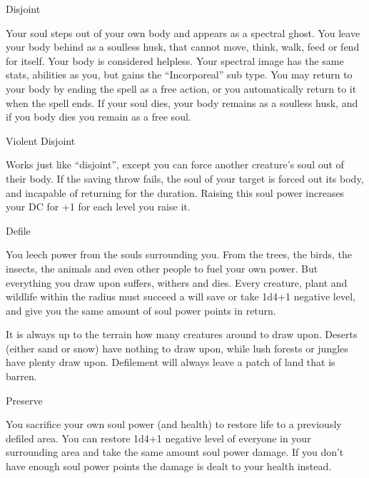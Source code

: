 \begin{soulpower}{Disjoint}
  \components{-}
  \rangepersonal

  Your soul steps out of your own body and appears as a spectral ghost. You
  leave your body behind as a soulless husk, that cannot move, think, walk,
  feed or fend for itself. Your body is considered helpless.
  Your spectral image has the same stats, abilities as you, but gains the
  ``Incorporeal'' sub type. You may return to your body by ending the spell
  as a free action, or you automatically return to it when the spell ends.
  If your soul dies, your body remains as a soulless husk, and if you body
  dies you remain as a free soul.
\end{soulpower}

\begin{soulpower}{Violent Disjoint}
  \rangetouch

  Works just like ``disjoint'', except you can force another creature's soul
  out of their body. If the saving throw fails, the soul of your target is
  forced out its body, and incapable of returning for the duration. Raising
  this soul power increases your DC for +1 for each level you raise it.
\end{soulpower}

\begin{soulpower}{Defile}
  \rangeclose

  You leech power from the souls surrounding you. From the trees, the birds,
  the insects, the animals and even other people to fuel your own power. But
  everything you draw upon suffers, withers and dies. Every creature, plant
  and wildlife within the radius must succeed a will save or take 1d4+1 negative
  level, and give you the same amount of soul power points in return.

  It is always up to the terrain how many creatures around to draw upon.
  Deserts (either sand or snow) have nothing to draw upon, while lush forests
  or jungles have plenty draw upon. Defilement will always leave a patch of
  land that is barren.
\end{soulpower}

\begin{soulpower}{Preserve}
  \rangeclose

  You sacrifice your own soul power (and health) to restore life to a
  previously defiled area. You can restore 1d4+1 negative level of everyone in
  your surrounding area and take the same amount soul power damage. If you
  don't have enough soul power points the damage is dealt to your health
  instead.
\end{soulpower}

